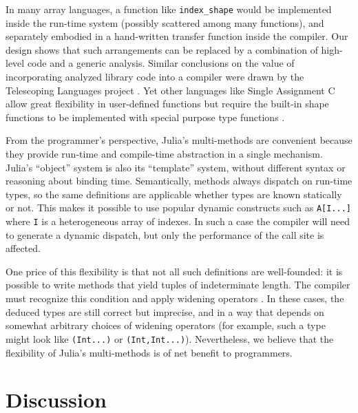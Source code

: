 \documentclass[preprint]{sigplanconf}
\newcommand{\code}[1]{\texttt{#1}}
\begin{document}
In many array languages, a function like
\code{index\_shape} would be implemented inside the run-time system
(possibly scattered among many functions), and separately embodied in
a hand-written transfer function inside the compiler. Our design shows
that such arrangements can be replaced by a combination of high-level code and
a generic analysis. Similar conclusions on the value of incorporating analyzed library code into a
compiler were drawn by the Telescoping Languages project \cite{telescoping}.
Yet other languages like Single Assignment C allow great flexibility in
user-defined functions but require the built-in shape functions to be
implemented with special purpose type functions
\cite{Scholz:2003sa,Grelck:2006sa}.

From the programmer's perspective, Julia's multi-methods are convenient
because they provide run-time and compile-time abstraction in a single
mechanism. Julia's ``object'' system is also 
its ``template'' system, without different syntax or reasoning about
binding time. Semantically, methods always dispatch on run-time
types, so the same definitions are applicable whether types are known
statically or not. This makes it possible to use popular
dynamic constructs such as \code{A[I...]} where \code{I} is a heterogeneous
array of indexes. In such a case the compiler will need to generate a
dynamic dispatch, but only the performance of the call site is affected.


One price of this flexibility is that not all such definitions are well-founded:
it is possible to write methods that yield tuples of indeterminate length.
The compiler must recognize this condition and apply widening operators
\cite{Cousot:1977, widening}. In these cases, the deduced types are
still correct but imprecise, and in a way that depends on somewhat arbitrary
choices of widening operators (for example, such a type might look
like \code{(Int...)} or \code{(Int,Int...)}). Nevertheless, we believe that the
flexibility of Julia's multi-methods is of net benefit to programmers.







\section{Discussion}
\end{document}
